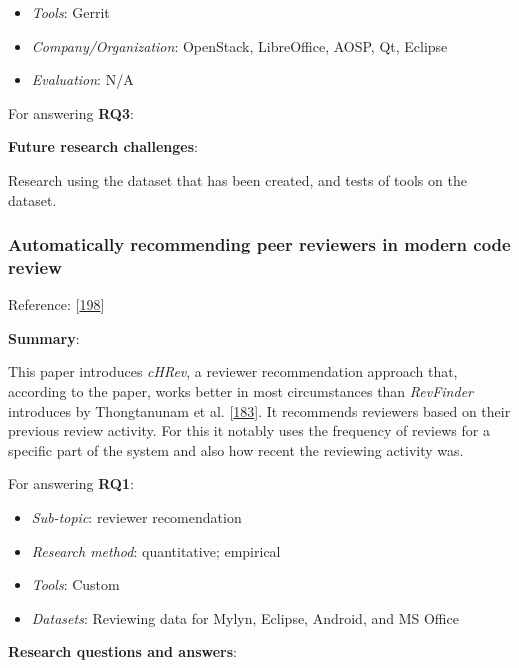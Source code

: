 \documentclass[]{book}
\providecommand{\tightlist}{%
  \setlength{\itemsep}{0pt}\setlength{\parskip}{0pt}}
\begin{document}
\begin{itemize}
\tightlist
\item
  \emph{Tools}: Gerrit
\item
  \emph{Company/Organization}: OpenStack, LibreOffice, AOSP, Qt, Eclipse
\item
  \emph{Evaluation}: N/A
\end{itemize}

For answering \textbf{RQ3}:

\textbf{Future research challenges}:

Research using the dataset that has been created, and tests of tools on
the dataset.

\subsubsection{Automatically recommending peer reviewers in modern code
review}\label{automatically-recommending-peer-reviewers-in-modern-code-review}

Reference: {[}\protect\hyperlink{ref-zanjani2016automatically}{198}{]}

\textbf{Summary}:

This paper introduces \emph{cHRev}, a reviewer recommendation approach
that, according to the paper, works better in most circumstances than
\emph{RevFinder} introduces by Thongtanunam et al.
{[}\protect\hyperlink{ref-thongtanunam2015should}{183}{]}. It recommends
reviewers based on their previous review activity. For this it notably
uses the frequency of reviews for a specific part of the system and also
how recent the reviewing activity was.

For answering \textbf{RQ1}:

\begin{itemize}
\tightlist
\item
  \emph{Sub-topic}: reviewer recomendation
\item
  \emph{Research method}: quantitative; empirical
\item
  \emph{Tools}: Custom
\item
  \emph{Datasets}: Reviewing data for Mylyn, Eclipse, Android, and MS
  Office
\end{itemize}

\textbf{Research questions and answers}:
\end{document}
